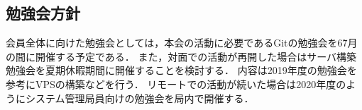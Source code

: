 \subsection*{勉強会方針}


会員全体に向けた勉強会としては，本会の活動に必要であるGitの勉強会を6\~7月の間に開催する予定である．
また，対面での活動が再開した場合はサーバ構築勉強会を夏期休暇期間に開催することを検討する．
内容は2019年度の勉強会を参考にVPSの構築などを行う．
リモートでの活動が続いた場合は2020年度のようにシステム管理局員向けの勉強会を局内で開催する．


